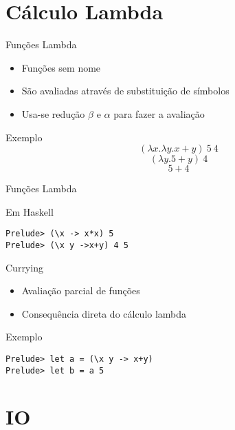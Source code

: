 \documentclass{beamer}
\begin{document}
	\section{Cálculo Lambda}

		\begin{frame}{Funções Lambda}
		 
		 \begin{itemize}
		  \item Funções sem nome
		  \item São avaliadas através de substituição de símbolos
		  \item Usa-se redução $\beta$ e $\alpha$ para fazer a avaliação
		 \end{itemize}
		 
		 \begin{block}{Exemplo}
		  \[(\lambda x. \lambda y. x+y)~ 5~ 4\]
		  \[(\lambda y. 5+y)~ 4\]
		  \[5+4\]		  
		 \end{block}		 
		\end{frame}
		
	\begin{frame}[fragile]{Funções Lambda}
	 
	 \begin{block}{Em Haskell}
	  \begin{lstlisting}	
Prelude> (\x -> x*x) 5
Prelude> (\x y ->x+y) 4 5
	  \end{lstlisting}	  
	 \end{block}
	\end{frame}

	\begin{frame}[fragile]{Currying}
		\begin{itemize}
			\item Avaliação parcial de funções
			\item Consequência direta do cálculo lambda
		\end{itemize}
		\begin{block}{Exemplo}
		 \begin{lstlisting}
Prelude> let a = (\x y -> x+y)
Prelude> let b = a 5
		 \end{lstlisting}
		\end{block}
	\end{frame}	
	
	\section{IO}
	
\end{document}

